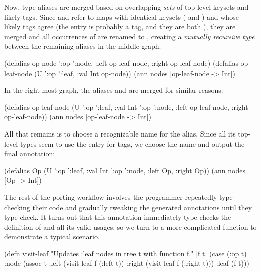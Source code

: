 Now, type aliases are merged based on overlapping \emph{sets} of top-level keysets and likely tags.
Since  and  refer to maps with identical keysets
( and ) and whose likely tags agree (the  entry
is probably a tag, and they are both ),
they are merged and all occurrences of 
are renamed to , creating a \emph{mutually recursive type}
between the remaining aliases in the middle graph:

\begin{cljlisting}
(defalias op-node '{:op ':node, :left op-leaf-node, :right op-leaf-node})
(defalias op-leaf-node (U '{:op ':leaf, :val Int} op-node))
(ann nodes [op-leaf-node -> Int])
\end{cljlisting}

In the right-most graph, the aliases  and  are merged for similar reasons:

\begin{cljlisting}
(defalias op-leaf-node
  (U '{:op ':leaf, :val Int}
     '{:op ':node, :left op-leaf-node, :right op-leaf-node}))
(ann nodes [op-leaf-node -> Int])
\end{cljlisting}

All that remains is to choose a recognizable name for the alias.
Since all its top-level types seem to use the  entry for
tags, we choose the name  and output the final annotation:

\begin{cljlisting}
(defalias Op (U '{:op ':leaf, :val Int}
                '{:op ':node, :left Op, :right Op}))
(ann nodes [Op -> Int])
\end{cljlisting}

The rest of the porting workflow involves the programmer repeatedly type checking
their code and gradually tweaking the generated annotations until they type check.
It turns out that this annotation immediately type checks the definition of 
and all its valid usages, so we turn to a more complicated function 
to demonstrate a typical scenario.

\begin{cljlisting}
(defn visit-leaf "Updates :leaf nodes in tree t with function f."
  [f t] (case (:op t)
          :node (assoc t :left (visit-leaf f (:left t))
                         :right (visit-leaf f (:right t)))
          :leaf (f t)))
\end{cljlisting}


